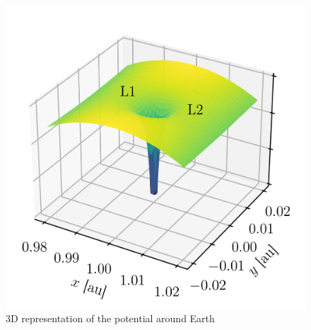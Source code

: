 \begin{figure}[h]
    \centering
    \includegraphics[width=0.6\linewidth]{figures/potential3D_L1_L2_zoom.png}
    \caption{3D representation of the potential around Earth}
    \label{fig:lagrange_potential_3D}
\end{figure}